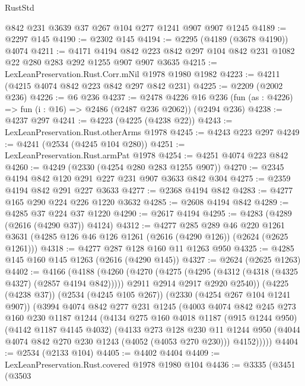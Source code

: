 \begin{lexlean}{RustStd}
\begin{coremodule}
    @842
    @231
    @3639
    @37
    @267
    @104
    @277
    @1241
    @907
    @907
    @1245
@4189 := @2297 @145
@4190 := @2302 @145
@4194 := @2295 (@4189 (@3678 @4190)) @4074
@4211 := @4171
    @4194
    @842
    @223
    @842
    @297
    @104
    @842
    @231
    @1082
    @22
    @280
    @283
    @292
    @1255
    @907
    @907
    @3635
@4215 := LexLeanPreservation.Rust.Corr.mNil @1978 @1980 @1982
@4223 := @4211 (@4215 @4074 @842 @223 @842 @297 @842 @231)
@4225 := @2209 (@2002 @236)
@4226 := @6 @236
@4237 := @2478
    @4226
    @16
    @236
    (fun (as : @4226) => fun (i : @16) => @2486 (@2487 @236 @2062))
    (@2494 @236)
@4238 := @4237 @297
@4241 := @4223 (@4225 (@4238 @22))
@4243 := LexLeanPreservation.Rust.otherArms @1978
@4245 := @4243 @223 @297
@4249 := @4241 (@2534 (@4245 @104 @280))
@4251 := LexLeanPreservation.Rust.armPat @1978
@4254 := @4251 @4074 @223 @842
@4260 := @4249 (@2330 (@4254 @280 @283 @1255 @907))
@4270 := @2345 @4194 @842 @120 @291 @227 @231 @907 @3633 @842 @304
@4275 := @2359 @4194 @842 @291 @227 @3633
@4277 := @2368 @4194 @842
@4283 := @4277 @165 @290 @224 @226 @1220 @3632
@4285 := @2608 @4194 @842
@4289 := @4285 @37 @224 @37 @1220
@4290 := @2617 @4194
@4295 := @4283 (@4289 (@2616 (@4290 @37)) @4124)
@4312 := @4277
    @285
    @289
    @46
    @220
    @1261
    @3631
    (@4285 @126 @46 @126 @1261 (@2616 (@4290 @126)) (@2624 (@2625 @1261)))
@4318 := @4277 @287 @128 @160 @11 @1263 @950
@4325 := @4285 @145 @160 @145 @1263 (@2616 (@4290 @145))
@4327 := @2624 (@2625 @1263)
@4402 := @4166
    (@4188
      (@4260
        (@4270
          (@4275 (@4295 (@4312 (@4318 (@4325 @4327) (@2857 @4194 @842)))))
          @2911
          @2914
          @2917
          @2920
          @2540))
      (@4225 (@4238 @37))
      (@2534 (@4245 @105 @267))
      (@2330 (@4254 @267 @104 @1241 @907))
      (@3994
        @4074
        @842
        @277
        @231
        @1245
        (@4003
          @4074
          @842
          @245
          @273
          @160
          @230
          @1187
          @1244
          (@4134
            @275
            @160
            @4018
            @1187
            (@915 @1244 @950)
            (@4142 @1187 @4145 @4032)
            (@4133
              @273
              @128
              @230
              @11
              @1244
              @950
              (@4044 @4074 @842 @270 @230 @1243 (@4052 (@4053 @270 @230)))
              @4152)))))
@4404 := @2534 (@2133 @104)
@4405 := @4402 @4404
@4409 := LexLeanPreservation.Rust.covered @1978 @1980 @104
@4436 := @3335
    (@3451
      (@3503

\end{coremodule}
\end{lexlean}
